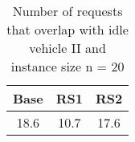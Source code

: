 \begin{table}[H]
\centering
\begin{tabular}{ccc}
  \hline
  \textbf{Base} & \textbf{RS1} & \textbf{RS2} \\\hline
  18.6 & 10.7 & 17.6 \\\hline
\end{tabular}
\caption{Number of requests that overlap with idle vehicle II and instance size n = 20}
\label{tab:wait:resrelocation-number-request-overlap-comparison_II_20}
\end{table}
